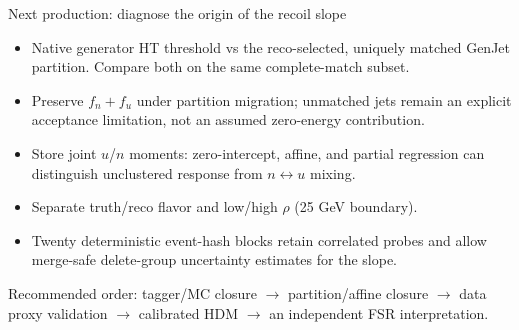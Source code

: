 \documentclass[aspectratio=169,10pt]{beamer}
\begin{document}
\begin{frame}{Next production: diagnose the origin of the recoil slope}
\small
\begin{itemize}
\item Native generator HT threshold vs the reco-selected, uniquely matched
GenJet partition. Compare both on the same complete-match subset.
\item Preserve $f_n+f_u$ under partition migration; unmatched jets remain an
explicit acceptance limitation, not an assumed zero-energy contribution.
\item Store joint $u$/$n$ moments: zero-intercept, affine, and partial regression
can distinguish unclustered response from $n\leftrightarrow u$ mixing.
\item Separate truth/reco flavor and low/high $\rho$ (25 GeV boundary).
\item Twenty deterministic event-hash blocks retain correlated probes and
allow merge-safe delete-group uncertainty estimates for the slope.
\end{itemize}
\medskip
Recommended order: tagger/MC closure $\to$ partition/affine closure $\to$
data proxy validation $\to$ calibrated HDM $\to$ an independent FSR interpretation.
\end{frame}
\end{document}
